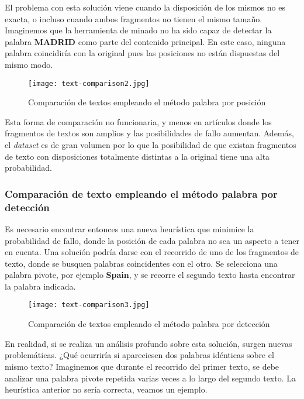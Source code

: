 El problema con esta solución viene cuando la disposición de los mismos no es exacta, o incluso cuando 
ambos fragmentos no tienen el mismo tamaño. Imaginemos que la herramienta de minado no ha sido capaz de 
detectar la palabra \textbf{MADRID} como parte del contenido principal. En este caso, ninguna palabra 
coincidiría con la original pues las posiciones no están dispuestas del mismo modo.

\begin{figure}[tphb]
  \centering
  \texttt{[image: text-comparison2.jpg]}
  \caption{Comparación de textos empleando el método palabra por posición}
  \label{img:comparacion de textos empleando el metodo palabra por posicion p2}
\end{figure}

Esta forma de comparación no funcionaria, y menos en artículos donde los fragmentos de textos son amplios
y las posibilidades de fallo aumentan. Además, el \emph{dataset} es de gran volumen por lo que la posibilidad 
de que existan fragmentos de texto con disposiciones totalmente distintas a la original tiene una alta 
probabilidad.

\subsubsection{Comparación de texto empleando el método palabra por detección}
\label{subsubsec:comparacion de textos empleando el metodo palabra por deteccion}

Es necesario encontrar entonces una nueva heurística que minimice la probabilidad de fallo, donde la 
posición de cada palabra no sea un aspecto a tener en cuenta. Una solución podría darse con el recorrido 
de uno de los fragmentos de texto, donde se busquen palabras coincidentes con el otro. Se selecciona una 
palabra pivote, por ejemplo \textbf{Spain}, y se recorre el segundo texto hasta encontrar la palabra 
indicada.

\begin{figure}[tphb]
  \centering
  \texttt{[image: text-comparison3.jpg]}
  \caption{Comparación de textos empleando el método palabra por detección}
  \label{img:comparacion de textos empleando el metodo palabra por deteccion}
\end{figure}

En realidad, si se realiza un análisis profundo sobre esta solución, surgen nuevas problemáticas. ¿Qué
ocurriría si apareciesen dos palabras idénticas sobre el mismo texto? Imaginemos que durante el recorrido
del primer texto, se debe analizar una palabra pivote repetida varias veces a lo largo del segundo texto. 
La heurística anterior no sería correcta, veamos un ejemplo.

